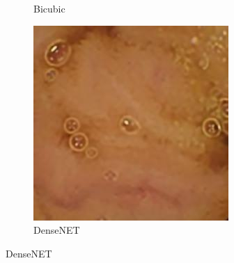 \begin{figure}[H]
\begin{subfigure}[b]{0.275\textwidth}
    \caption{Bicubic}
  \end{subfigure}
  \begin{subfigure}[b]{0.275\textwidth}
    \includegraphics[width=\textwidth]{Chapter7/Dense_9.jpg}
    \caption{DenseNET}
  \end{subfigure}
  

\end{figure}

